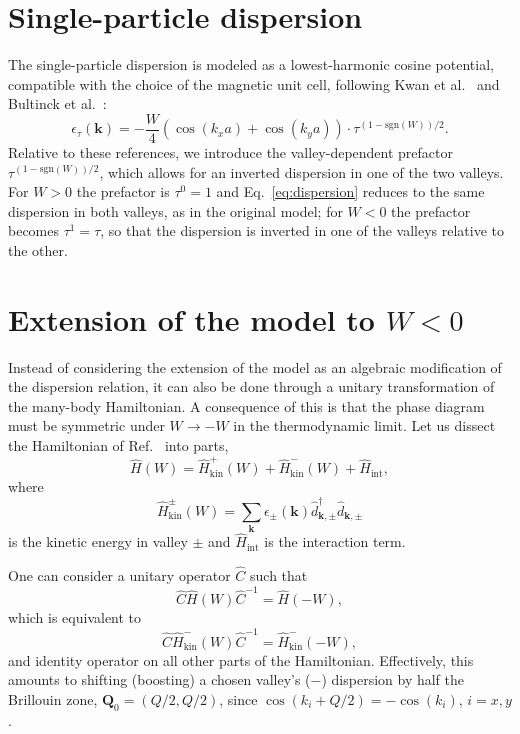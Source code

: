 \section{Single-particle dispersion}
The single-particle dispersion is modeled as a lowest-harmonic cosine potential, compatible with the choice of the magnetic unit cell, following Kwan et al.~\cite{kwan2025textured} and Bultinck et al.~\cite{PhysRevLett.124.166601}:
\begin{equation}
    \epsilon_\tau(\mathbf{k}) = -\frac{W}{4} \left( \cos(k_x a) + \cos(k_y a) \right) \cdot \tau^{(1 - \mathrm{sgn}(W))/2}.
    \label{eq:dispersion}
\end{equation}
Relative to these references, we introduce the valley-dependent prefactor $\tau^{(1-\mathrm{sgn}(W))/2}$, which allows for an inverted dispersion in one of the two valleys. For $W>0$ the prefactor is $\tau^0=1$ and Eq.~\eqref{eq:dispersion} reduces to the same dispersion in both valleys, as in the original model; for $W<0$ the prefactor becomes $\tau^1 = \tau$, so that the dispersion is inverted in one of the valleys relative to the other.


\section{Extension of the model to \texorpdfstring{$W<0$}{W < 0}}\label{sec:symmetries}

Instead of considering the extension of the model as an algebraic modification of the dispersion relation, it can also be done through a unitary transformation of the many-body Hamiltonian. A consequence of this is that the phase diagram must be symmetric under $W \to -W$ in the thermodynamic limit. Let us dissect the Hamiltonian of Ref.~\cite{kwan2025textured} into parts,
\begin{equation}
    \hat{H}(W) = \hat{H}_{\text{kin}}^+(W) + \hat{H}_{\text{kin}}^-(W) + \hat{H}_{\text{int}},
\end{equation}
where
\begin{equation}
    \hat{H}_{\text{kin}}^\pm(W) = \sum_{\mathbf{k}} \epsilon_\pm(\mathbf{k}) \hat{d}_{\mathbf{k},\pm}^\dagger \hat{d}_{\mathbf{k},\pm}
\end{equation}
is the kinetic energy in valley $\pm$ and $\hat{H}_{\text{int}}$ is the interaction term.

One can consider a unitary operator $\hat{C}$ such that
\begin{equation}
     \hat{C}\hat{H}(W) \hat{C}^{-1} = \hat{H}(-W),
\end{equation}
which is equivalent to
\begin{equation}
    \hat{C} \hat{H}_{\text{kin}}^-(W) \hat{C}^{-1} = \hat{H}_{\text{kin}}^-(-W),
\end{equation}
and identity operator on all other parts of the Hamiltonian. Effectively, this amounts to shifting (boosting) a chosen valley's ($-$) dispersion by half the Brillouin zone, $\mathbf{Q}_0 = (Q/2, Q/2)$, since $\cos(k_i + Q/2) = -\cos(k_i),\, i = x,y$.

